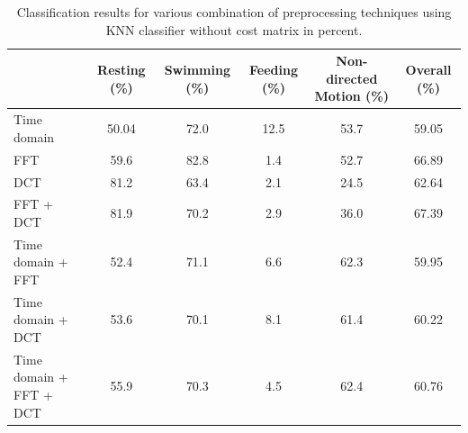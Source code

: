 \documentclass[conference]{IEEEtran}
\begin{document}

\begin{table}[h]
	\centering
	\caption{Classification results for various combination of preprocessing techniques using KNN classifier without cost matrix in percent.}
	\begin{tabular}{l c c c c c}
	\hline
	& \textbf{Resting} (\%) & \textbf{Swimming}  (\%) & \textbf{Feeding}  (\%) & \textbf{Non-directed Motion}  (\%) & \textbf{Overall}  (\%) \\
	\hline
	Time domain & 50.04&	72.0&	12.5&	53.7&	59.05\\
     FFT & 59.6&	82.8&	1.4&	52.7&	66.89\\
     DCT & 81.2&	63.4&	2.1&	24.5&	62.64 \\
   FFT + DCT & 81.9&	70.2&	2.9&	36.0& 	67.39\\
	Time domain + FFT & 52.4& 	71.1&	6.6&	62.3&	59.95 \\
	Time domain + DCT & 53.6& 	70.1&	8.1&	61.4&	60.22\\
	Time domain + FFT + DCT & 55.9&	70.3&	4.5&	62.4&	60.76 \\
	\hline
	\end{tabular}
	\label{without cost matrix}
\end{table}
\end{document}
